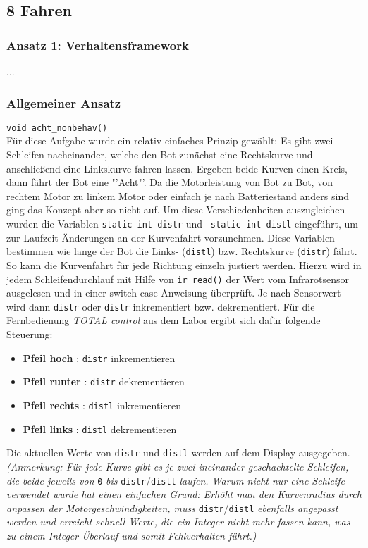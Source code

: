 \subsection{8 Fahren}
\label{8-fahren}

\subsubsection{Ansatz 1: Verhaltensframework}

...

\subsubsection{Allgemeiner Ansatz}
\noindent \verb+void acht_nonbehav()+ \\

Für diese Aufgabe wurde ein relativ einfaches Prinzip gewählt: Es gibt zwei Schleifen nacheinander, welche den Bot zunächst eine Rechtskurve und anschließend eine Linkskurve fahren lassen. Ergeben beide Kurven einen Kreis, dann fährt der Bot eine "'Acht"'. Da die Motorleistung von Bot zu Bot, von rechtem Motor zu linkem Motor oder einfach je nach Batteriestand anders sind ging das Konzept aber so nicht auf.
Um diese Verschiedenheiten auszugleichen wurden die Variablen \verb+static int distr+ und \verb+ static int distl+ eingeführt, um zur Laufzeit Änderungen an der Kurvenfahrt vorzunehmen. Diese Variablen bestimmen wie lange der Bot die Links- (\verb+distl+) bzw. Rechtskurve (\verb+distr+) fährt. So kann die Kurvenfahrt für jede Richtung einzeln justiert werden. 
Hierzu wird in jedem Schleifendurchlauf mit Hilfe von \verb+ir_read()+ der Wert vom Infrarotsensor ausgelesen und in einer switch-case-Anweisung überprüft. Je nach Sensorwert wird dann \verb+distr+ oder \verb+distr+ inkrementiert bzw. dekrementiert. Für die Fernbedienung \textit{TOTAL control} aus dem Labor ergibt sich dafür folgende Steuerung:
\begin{itemize}
	\item \textbf{Pfeil hoch}   : \verb_distr_  inkrementieren
	\item \textbf{Pfeil runter} : \verb_distr_  dekrementieren
	\item \textbf{Pfeil rechts} : \verb_distl_  inkrementieren
	\item \textbf{Pfeil links}  : \verb_distl_  dekrementieren
\end{itemize}

\noindent Die aktuellen Werte von \verb+distr+ und \verb+distl+ werden auf dem Display ausgegeben.\\

\textit{(Anmerkung: Für jede Kurve gibt es je zwei ineinander geschachtelte Schleifen, die beide jeweils von }\verb+0+\textit{ bis }\verb+distr+/\verb+distl+\textit{ laufen. Warum nicht nur eine Schleife verwendet wurde hat einen einfachen Grund: Erhöht man den Kurvenradius durch anpassen der Motorgeschwindigkeiten, muss }\verb+distr+/\verb+distl+\textit{ ebenfalls angepasst werden und erreicht schnell Werte, die ein Integer nicht mehr fassen kann, was zu einem Integer-Überlauf und somit Fehlverhalten führt.)}

